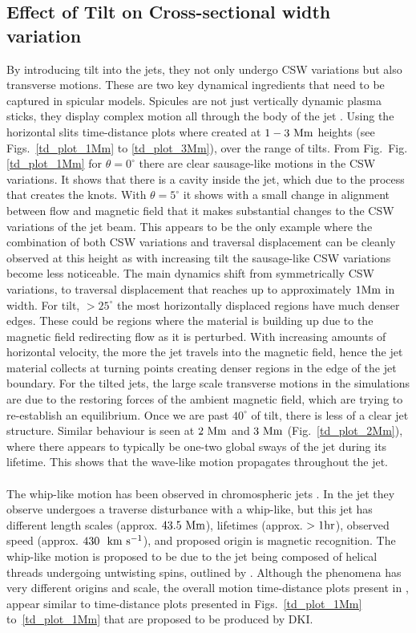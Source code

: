 \documentclass[12pt]{ociamthesis}
\newcommand{\fref}[1]{Fig. \eqref{#1}}
\newcommand{\kms}{~\rm{km ~s^{-1}}}
\newcommand{\np}{\\ \\}
\newcommand{\degs}{^{\circ}}
\begin{document}
\subsection{Effect of Tilt on Cross-sectional width variation}
\label{subsec:oscillating}
By introducing tilt into the jets, they not only undergo CSW variations but also transverse motions. These are two key dynamical ingredients that need to be captured in spicular models. Spicules are not just vertically dynamic plasma sticks, they display complex motion all through the body of the jet \citep{Sharma2018ApJ85361S}. Using the horizontal slits time-distance plots where created at $1-3~\rm{Mm}$ heights (see Figs.~\ref{td_plot_1Mm} to \ref{td_plot_3Mm}), over the range of tilts. From Fig.~\fref{td_plot_1Mm} for $\theta=0^{\circ}$ there are clear sausage-like motions in the CSW variations. It shows that there is a cavity inside the jet, which due to the process that creates the knots. With $\theta=5^{\circ}$ it shows with a small change in alignment between flow and magnetic field that it makes substantial changes to the CSW variations of the jet beam. This appears to be the only example where the combination of both CSW variations and traversal displacement can be cleanly observed at this height as with increasing tilt the sausage-like CSW variations become less noticeable. The main dynamics shift from symmetrically CSW variations, to traversal displacement that reaches up to approximately $1\rm{Mm}$ in width. For tilt, $>25\degs$ the most horizontally displaced regions have much denser edges. These could be regions where the material is building up due to the magnetic field redirecting flow as it is perturbed. With increasing amounts of horizontal velocity, the more the jet travels into the magnetic field, hence the jet material collects at turning points creating denser regions in the edge of the jet boundary. For the tilted jets, the large scale transverse motions in the simulations are due to the restoring forces of the ambient magnetic field, which are trying to re-establish an equilibrium. Once we are past $40\degs$ of tilt, there is less of a clear jet structure. Similar behaviour is seen at $2~\rm{Mm}$ and $3~\rm{Mm}$ (Fig.~\ref{td_plot_2Mm}), where there appears to typically be one-two global sways of the jet during its lifetime. This shows that the wave-like motion propagates throughout the jet. \np
%
The whip-like motion has been observed in chromospheric jets \citep{Liu2009ApJ707L37L}. In \cite{Liu2009ApJ707L37L} the jet they observe undergoes a traverse disturbance with a whip-like, but this jet has different length scales (approx. $43.5~\rm{Mm}$), lifetimes (approx. $>1\rm{hr}$), observed speed (approx. $430~\kms$), and proposed origin is magnetic recognition. The whip-like motion is proposed to be due to the jet being composed of helical threads undergoing untwisting spins, outlined by \cite{Shibata1985PASJ3731S, Shibata1986SoPh103299S, Canfield1996ApJ4641016C}. Although the phenomena has very different origins and scale, the overall motion time-distance plots present in \cite{Liu2009ApJ707L37L}, appear similar to time-distance plots presented in Figs.~\ref{td_plot_1Mm} to~\ref{td_plot_1Mm} that are proposed to be produced by DKI. \np
\end{document}
